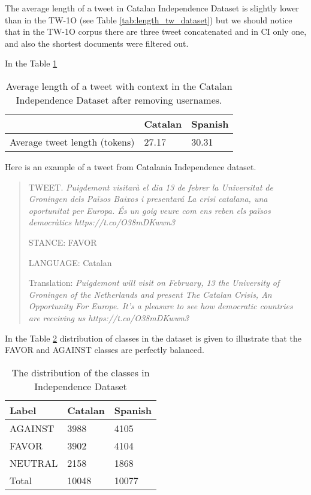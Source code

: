 \documentclass[10pt, a4paper]{article}
\begin{document}
The average length of a tweet in Catalan Independence Dataset is slightly lower than in the TW-1O (see Table \ref{tab:length_tw_dataset}) but we should notice that in the TW-1O corpus there are three tweet concatenated and in CI only one, and also the shortest documents were filtered out.  

In the Table \ref{tab:length_ind_dataset} 

\begin{table}[!h]
\begin{center}
\begin{tabularx}{\columnwidth}{|l|l|X|}

      \hline
        &Catalan&Spanish\\
      \hline
        Average tweet length (tokens)&27.17& 30.31\\
      \hline


\end{tabularx}
\caption{Average length of a tweet with context in the Catalan Independence Dataset after removing usernames.}
 \end{center}
 \label{tab:length_ind_dataset}
\end{table}


Here is an example of a tweet from Catalania Independence dataset. 

\begin{quote}
TWEET. \textit{Puigdemont visitar\`a el dia 13 de febrer la Universitat de Groningen dels Pa\"isos Baixos i presentar\'a  La crisi catalana, una oportunitat per Europa. \'Es un goig veure com ens reben els pa\"isos democr\`atics https://t.co/O38mDKwwn3} 

STANCE: FAVOR 

LANGUAGE: Catalan

Translation: \textit{Puigdemont will visit
on February, 13 the University of Groningen of the Netherlands and present The Catalan Crisis, An Opportunity For Europe.
It's a pleasure to see how democratic countries are receiving us https://t.co/O38mDKwwn3}
\end{quote}

In the Table \ref{tab:distr_dataset} distribution of classes in the dataset is given to illustrate that the FAVOR and AGAINST classes are perfectly balanced. 


\begin{table}[h]
\begin{center}
\begin{tabularx}{\columnwidth}{|l|l|X|}

      \hline
        Label&Catalan&Spanish\\
      \hline
        AGAINST & 3988&4105\\
      \hline
        FAVOR & 3902&4104\\
      \hline
        NEUTRAL & 2158&1868\\
      \hline
        Total & 10048&10077\\
      \hline

\end{tabularx}
\caption{The distribution of the classes in Independence Dataset}
 \end{center}
 \label{tab:distr_dataset}
\end{table}
\end{document}
